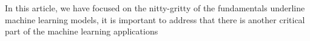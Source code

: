 In this article, we have focused on the nitty-gritty of the fundamentals underline machine learning models, it is important to address that there is another critical part of the machine learning applications 